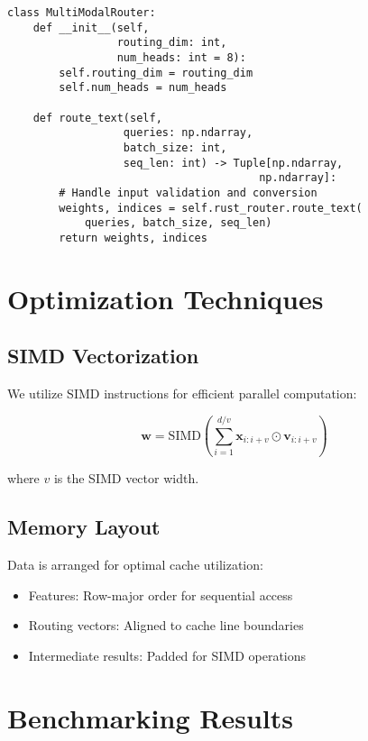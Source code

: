 \documentclass[10pt]{article}
\begin{document}
\begin{verbatim}
class MultiModalRouter:
    def __init__(self, 
                 routing_dim: int, 
                 num_heads: int = 8):
        self.routing_dim = routing_dim
        self.num_heads = num_heads
        
    def route_text(self, 
                  queries: np.ndarray, 
                  batch_size: int, 
                  seq_len: int) -> Tuple[np.ndarray, 
                                       np.ndarray]:
        # Handle input validation and conversion
        weights, indices = self.rust_router.route_text(
            queries, batch_size, seq_len)
        return weights, indices
\end{verbatim}

\section{Optimization Techniques}

\subsection{SIMD Vectorization}
We utilize SIMD instructions for efficient parallel computation:

\begin{equation}
    \mathbf{w} = \text{SIMD}\left(\sum_{i=1}^{d/v} \mathbf{x}_{i:i+v} \odot \mathbf{v}_{i:i+v}\right)
\end{equation}

where $v$ is the SIMD vector width.

\subsection{Memory Layout}
Data is arranged for optimal cache utilization:

\begin{itemize}
    \item Features: Row-major order for sequential access
    \item Routing vectors: Aligned to cache line boundaries
    \item Intermediate results: Padded for SIMD operations
\end{itemize}

\section{Benchmarking Results}
\end{document}
